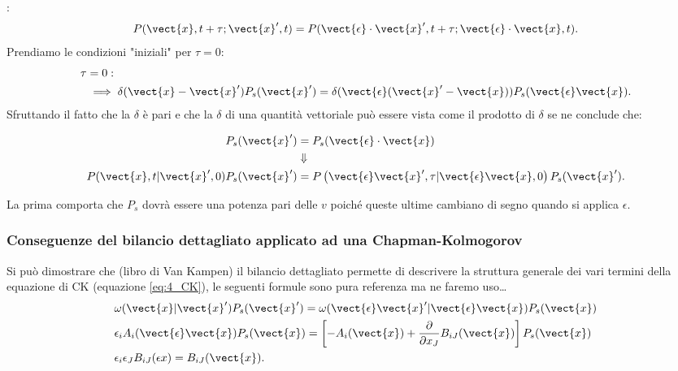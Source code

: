 :
\[
    P(\vect{x}, t+\tau ; \vect{x}', t) = 
    P(\vect{\epsilon}\cdot \vect{x}', t+\tau ; \vect{\epsilon}\cdot \vect{x}, t) 
.\] 
Prendiamo le condizioni "iniziali" per $\tau=0$:
\[\begin{aligned}
    \tau & = 0 :\\
	     &\implies  \delta (\vect{x}-\vect{x}') P_s(\vect{x}') = \delta (\vect{\epsilon} (\vect{x}'-\vect{x})) P_s(\vect{\epsilon}\vect{x}) 
.\end{aligned}\]
Sfruttando il fatto che la $\delta$ è pari e che la $\delta$ di una quantità vettoriale può essere vista come il prodotto di $\delta$ se ne conclude che:
\begin{redbox}{}
    \[\begin{aligned}
	P_s(\vect{x}') &= P_s(\vect{\epsilon}\cdot \vect{x}) \\
		       & \Downarrow\\
	P(\vect{x},t|\vect{x}', 0) P_s(\vect{x}') &=
        P\left(\vect{\epsilon}\vect{x}',\tau|\vect{\epsilon}\vect{x},0\right)P_s(\vect{x}') 
    .\end{aligned}\]
\end{redbox}
\noindent
La prima comporta che $P_s$ dovrà essere una potenza pari delle $v$ poiché queste ultime cambiano di segno quando si applica $\epsilon$.
\subsubsection{Conseguenze del bilancio dettagliato applicato ad una Chapman-Kolmogorov}%
\label{subsub:Conseguenze del bilancio dettagliato applicato ad una Chapman-Kolmogorov}
Si può dimostrare che (libro di Van Kampen) il bilancio dettagliato permette di descrivere la struttura generale dei vari termini della equazione di CK (equazione \ref{eq:4_CK}), le seguenti formule sono pura referenza ma ne faremo uso\ldots
\begin{equation} 
\begin{aligned}
    &\omega (\vect{x}|\vect{x}') P_s(\vect{x}') = \omega (\vect{\epsilon} \vect{x}'|\vect{\epsilon} \vect{x}) P_s(\vect{x}) \\
    &\epsilon_i A_i(\vect{\epsilon}\vect{x}) P_s(\vect{x}) =\left[-A_i(\vect{x}) + \frac{\partial }{\partial x_J} B_{iJ}(\vect{x})\right]P_s(\vect{x}) \\
    & \epsilon_i \epsilon_J B_{iJ}(\epsilon x) = B_{iJ}(\vect{x}) 
    \label{eq:11_ref}
.\end{aligned}\end{equation}
